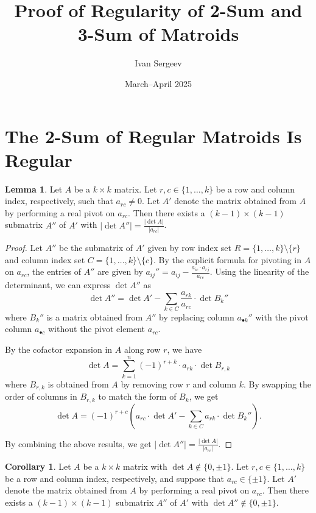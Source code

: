 \documentclass{article}
\title{Proof of Regularity of 2-Sum and 3-Sum of Matroids}
\author{Ivan Sergeev}
\date{March--April 2025}
\theoremstyle{definition}
\newtheorem{lemma}[theorem]{Lemma}
\newtheorem{corollary}[theorem]{Corollary}
\begin{document}
\maketitle

\section{The 2-Sum of Regular Matroids Is Regular}

\begin{lemma}\label{lem:pivot_submatrix_det}
    Let $A$ be a $k \times k$ matrix. Let $r, c \in \{1, \dots, k\}$ be a row and column index, respectively, such that $a_{rc} \neq 0$. Let $A'$ denote the matrix obtained from $A$ by performing a real pivot on $a_{rc}$. Then there exists a $(k - 1) \times (k - 1)$ submatrix $A''$ of $A'$ with $|\det A''| = \frac{|\det A|}{|a_{rc}|}$.
\end{lemma}

\begin{proof}
    Let $A''$ be the submatrix of $A'$ given by row index set $R = \{1, \dots, k\} \setminus \{r\}$ and column index set $C = \{1, \dots, k\} \setminus \{c\}$. By the explicit formula for pivoting in $A$ on $a_{rc}$, the entries of $A''$ are given by $a_{ij}'' = a_{ij} - \frac{a_{ic} \cdot a_{rj}}{a_{rc}}$. Using the linearity of the determinant, we can express $\det A''$ as
    \[
        \det A'' = \det A' - \sum_{k \in C} \frac{a_{rk}}{a_{rc}} \cdot \det B_{k}''
    \]
    where $B_{k}''$ is a matrix obtained from $A''$ by replacing column $a_{\bullet k}''$ with the pivot column $a_{\bullet c}$ without the pivot element $a_{rc}$.

    By the cofactor expansion in $A$ along row $r$, we have
    \[
        \det A = \sum_{k = 1}^{n} (-1)^{r + k} \cdot a_{rk} \cdot \det B_{r, k}
    \]
    where $B_{r, k}$ is obtained from $A$ by removing row $r$ and column $k$. By swapping the order of columns in $B_{r, k}$ to match the form of $B_{k}$, we get
    \[
        \det A = (-1)^{r + c} (a_{rc} \cdot \det A' - \sum_{k \in C} a_{rk} \cdot \det B_{k}'').
    \]

    By combining the above results, we get $|\det A''| = \frac{|\det A|}{|a_{rc}|}$.
\end{proof}

\begin{corollary}\label{cor:pivot_submatrix_det}
    Let $A$ be a $k \times k$ matrix with $\det A \notin \{0, \pm 1\}$. Let $r, c \in \{1, \dots, k\}$ be a row and column index, respectively, and suppose that $a_{rc} \in \{\pm 1\}$. Let $A'$ denote the matrix obtained from $A$ by performing a real pivot on $a_{rc}$. Then there exists a $(k - 1) \times (k - 1)$ submatrix $A''$ of $A'$ with $\det A'' \notin \{0, \pm 1\}$.
\end{corollary}
\end{document}
